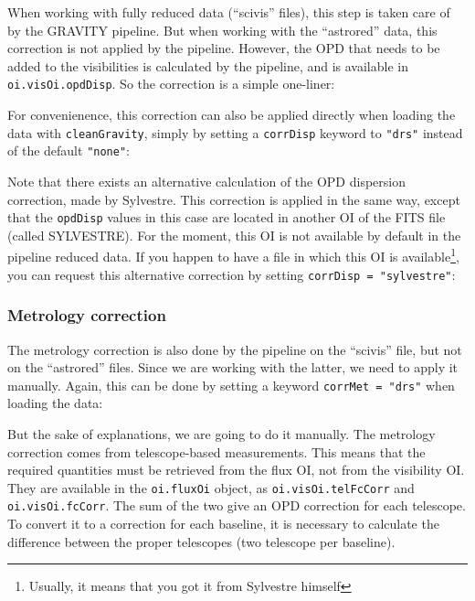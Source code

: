 When working with fully reduced data (``scivis'' files), this step is taken care of by the GRAVITY pipeline. But when working with the ``astrored'' data, this correction is not applied by the pipeline. However, the OPD that needs to be added to the visibilities is calculated by the pipeline, and is available in \verb|oi.visOi.opdDisp|. So the correction is a simple one-liner:


\noindent{}For convenienence, this correction can also be applied directly when loading the data with \verb|cleanGravity|, simply by setting a \verb|corrDisp| keyword to \verb|"drs"| instead of the default \verb|"none"|:


Note that there exists an alternative calculation of the OPD dispersion correction, made by Sylvestre. This correction is applied in the same way, except that the \verb|opdDisp| values in this case are located in another OI of the FITS file (called SYLVESTRE). For the moment, this OI is not available by default in the pipeline reduced data. If you happen to have a file in which this OI is available\footnote{Usually, it means that you got it from Sylvestre himself}, you can request this alternative correction by setting \verb|corrDisp = "sylvestre"|:



\subsubsection{Metrology correction}

The metrology correction is also done by the pipeline on the ``scivis'' file, but not on the ``astrored'' files. Since we are working with the latter, we need to apply it manually. Again, this can be done by setting a keyword \verb|corrMet = "drs"| when loading the data:


But the sake of explanations, we are going to do it manually. The metrology correction comes from telescope-based measurements. This means that the required quantities must be retrieved from the flux OI, not from the visibility OI. They are available in the \verb|oi.fluxOi| object, as \verb|oi.visOi.telFcCorr| and \verb|oi.visOi.fcCorr|. The sum of the two give an OPD correction for each telescope. To convert it to a correction for each baseline, it is necessary to calculate the difference between the proper telescopes (two telescope per baseline).


